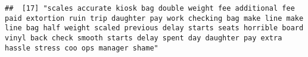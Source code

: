 \documentclass[
]{article}
\begin{document}
\begin{verbatim}
##  [17] "scales accurate kiosk bag double weight fee additional fee paid extortion ruin trip daughter pay work checking bag make line make line bag half weight scaled previous delay starts seats horrible board vinyl back check smooth starts delay spent day daughter pay extra hassle stress coo ops manager shame"                                                                                                                                                                                                                                                                                                                                                                                                                                                                                                                                                                                                                                                                                                                                                                                                                                                                                                                                                                                                                                                                                                                                                                                                                                                                                                                                                                                                                                                                                

\end{verbatim}
\end{document}
